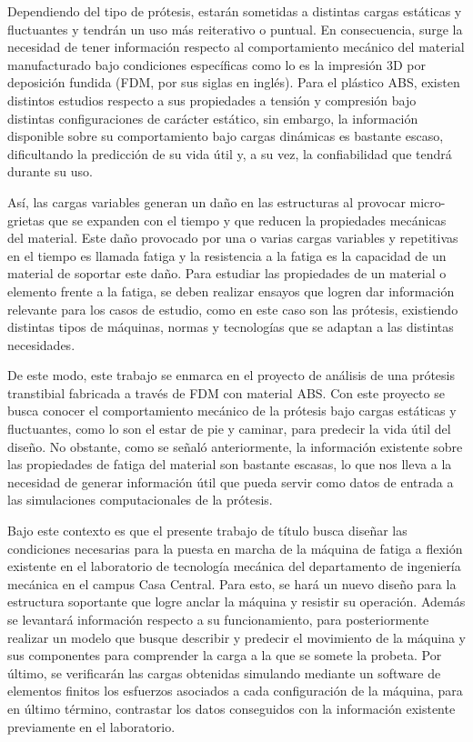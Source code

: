 Dependiendo del tipo de prótesis, estarán sometidas a distintas cargas estáticas y fluctuantes y tendrán un uso más reiterativo o puntual. En consecuencia, surge la necesidad de tener información respecto al comportamiento mecánico del material manufacturado bajo condiciones específicas como lo es la impresión 3D por deposición fundida (FDM, por sus siglas en inglés). Para el plástico ABS, existen distintos estudios respecto a sus propiedades a tensión y compresión bajo distintas configuraciones de carácter estático, sin embargo, la información disponible sobre su comportamiento bajo cargas dinámicas es bastante escaso, dificultando la predicción de su vida útil y, a su vez, la confiabilidad que tendrá durante su uso.

Así, las cargas variables generan un daño en las estructuras al provocar micro-grietas que se expanden con el tiempo y que reducen la propiedades mecánicas del material. Este daño provocado por una o varias cargas variables y repetitivas en el tiempo es llamada fatiga y la resistencia a la fatiga es la capacidad de un material de soportar este daño. Para estudiar las propiedades de un material o elemento frente a la fatiga, se deben realizar ensayos que logren dar información relevante para los casos de estudio, como en este caso son las prótesis, existiendo distintas tipos de máquinas, normas y tecnologías que se adaptan a las distintas necesidades.

De este modo, este trabajo se enmarca en el proyecto de análisis de una prótesis transtibial fabricada a través de FDM con material ABS. Con este proyecto se busca conocer el comportamiento mecánico de la prótesis bajo cargas estáticas y fluctuantes, como lo son el estar de pie y caminar, para predecir la vida útil del diseño. No obstante, como se señaló anteriormente, la información existente sobre las propiedades de fatiga del material son bastante escasas, lo que nos lleva a la necesidad de generar información útil que pueda servir como datos de entrada a las simulaciones computacionales de la prótesis.

Bajo este contexto es que el presente trabajo de título busca diseñar las condiciones necesarias para la puesta en marcha de la máquina de fatiga a flexión existente en el laboratorio de tecnología mecánica del departamento de ingeniería mecánica en el campus Casa Central. Para esto, se hará un nuevo diseño para la estructura soportante que logre anclar la máquina y resistir su operación. Además se levantará información respecto a su funcionamiento, para posteriormente realizar un modelo que busque describir y predecir el movimiento de la máquina y sus componentes para comprender la carga a la que se somete la probeta. Por último, se verificarán las cargas obtenidas simulando mediante un software de elementos finitos los esfuerzos asociados a cada configuración de la máquina, para en último término, contrastar los datos conseguidos con la información existente previamente en el laboratorio.

